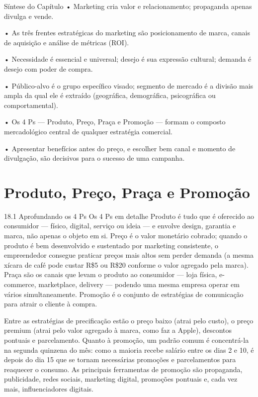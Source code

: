 Síntese do Capítulo • Marketing cria valor e relacionamento; propaganda apenas divulga e vende.

• As três frentes estratégicas do marketing são posicionamento de marca, canais de aquisição e análise de métricas (ROI).

• Necessidade é essencial e universal; desejo é sua expressão cultural; demanda é desejo com poder de compra.

• Público-alvo é o grupo específico visado; segmento de mercado é a divisão mais ampla da qual ele é extraído (geográfica, demográfica, psicográfica ou comportamental).

• Os 4 Ps — Produto, Preço, Praça e Promoção — formam o composto mercadológico central de qualquer estratégia comercial.

• Apresentar benefícios antes do preço, e escolher bem canal e momento de divulgação, são decisivos para o sucesso de uma campanha.

\chapter{Produto, Preço, Praça e Promoção}

18.1 Aprofundando os 4 Ps Os 4 Ps em detalhe Produto é tudo que é oferecido ao consumidor — físico, digital, serviço ou ideia — e envolve design, garantia e marca, não apenas o objeto em si. Preço é o valor monetário cobrado; quando o produto é bem desenvolvido e sustentado por marketing consistente, o empreendedor consegue praticar preços mais altos sem perder demanda (a mesma xícara de café pode custar R\$5 ou R\$20 conforme o valor agregado pela marca). Praça são os canais que levam o produto ao consumidor — loja física, e-commerce, marketplace, delivery — podendo uma mesma empresa operar em vários simultaneamente. Promoção é o conjunto de estratégias de comunicação para atrair o cliente à compra.

Entre as estratégias de precificação estão o preço baixo (atrai pelo custo), o preço premium (atrai pelo valor agregado à marca, como faz a Apple), descontos pontuais e parcelamento. Quanto à promoção, um padrão comum é concentrá-la na segunda quinzena do mês: como a maioria recebe salário entre os dias 2 e 10, é depois do dia 15 que se tornam necessárias promoções e parcelamentos para reaquecer o consumo. As principais ferramentas de promoção são propaganda, publicidade, redes sociais, marketing digital, promoções pontuais e, cada vez mais, influenciadores digitais.

